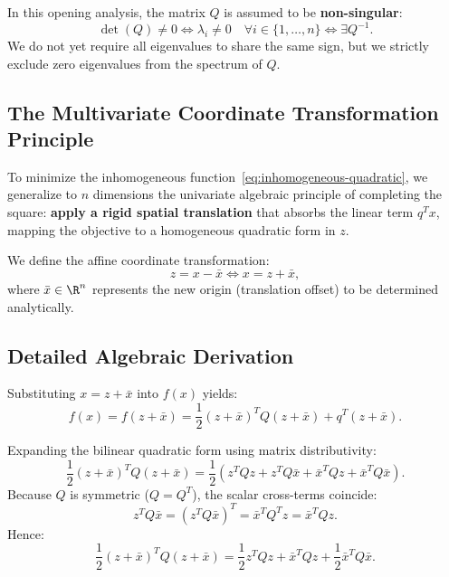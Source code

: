 In this opening analysis, the matrix $Q$ is assumed to be \textbf{non-singular}:
\begin{equation}
    \det(Q) \neq 0 \iff \lambda_i \neq 0 \quad \forall i \in \{1, \dots, n\} \iff \exists Q^{-1}.
\end{equation}
We do not yet require all eigenvalues to share the same sign, but we strictly exclude zero eigenvalues from the spectrum of $Q$.

\subsection{The Multivariate Coordinate Transformation Principle}
To minimize the inhomogeneous function~\eqref{eq:inhomogeneous-quadratic}, we generalize to $n$ dimensions the univariate algebraic principle of completing the square: \textbf{apply a rigid spatial translation} that absorbs the linear term $q^T x$, mapping the objective to a homogeneous quadratic form in $z$.

We define the affine coordinate transformation:
\begin{equation}
    z = x - \bar{x} \iff x = z + \bar{x},
    \label{eq:coord-shift-z}
\end{equation}
where $\bar{x} \in \R^n$ represents the new origin (translation offset) to be determined analytically.

\subsection{Detailed Algebraic Derivation}
Substituting $x = z + \bar{x}$ into $f(x)$ yields:
\begin{equation}
    f(x) = f(z + \bar{x}) = \frac{1}{2} (z + \bar{x})^T Q (z + \bar{x}) + q^T (z + \bar{x}).
\end{equation}

Expanding the bilinear quadratic form using matrix distributivity:
\begin{equation}
    \frac{1}{2} (z + \bar{x})^T Q (z + \bar{x}) = \frac{1}{2} \left( z^T Q z + z^T Q \bar{x} + \bar{x}^T Q z + \bar{x}^T Q \bar{x} \right).
\end{equation}
Because $Q$ is symmetric ($Q = Q^T$), the scalar cross-terms coincide:
\begin{equation}
    z^T Q \bar{x} = (z^T Q \bar{x})^T = \bar{x}^T Q^T z = \bar{x}^T Q z.
\end{equation}
Hence:
\begin{equation}
    \frac{1}{2} (z + \bar{x})^T Q (z + \bar{x}) = \frac{1}{2} z^T Q z + \bar{x}^T Q z + \frac{1}{2} \bar{x}^T Q \bar{x}.
\end{equation}

